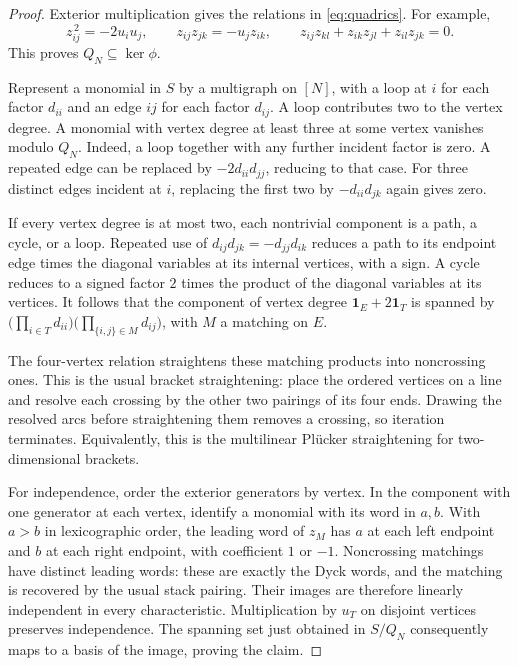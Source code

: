 \documentclass[11pt]{article}
\theoremstyle{definition}
\theoremstyle{remark}
\numberwithin{equation}{section}
\newcommand{\one}{\mathbf{1}}
\begin{document}
\begin{proof}
Exterior multiplication gives the relations in \eqref{eq:quadrics}.
For example,
\[
 z_{ij}^{\,2}=-2u_i u_j,\qquad
 z_{ij}z_{jk}=-u_jz_{ik},\qquad
 z_{ij}z_{kl}+z_{ik}z_{jl}+z_{il}z_{jk}=0.
\]
This proves $Q_N\subseteq\ker\phi$.

Represent a monomial in $S$ by a multigraph on $[N]$, with a loop at $i$
for each factor $d_{ii}$ and an edge $ij$ for each factor $d_{ij}$.
A loop contributes two to the vertex degree. A monomial with vertex
degree at least three at some vertex vanishes modulo $Q_N$. Indeed, a
loop together with any further incident factor is zero. A repeated
edge can be replaced by $-2d_{ii}d_{jj}$, reducing to that case. For
three distinct edges incident at $i$, replacing the first two by
$-d_{ii}d_{jk}$ again gives zero.

If every vertex degree is at most two, each nontrivial component is a
path, a cycle, or a loop. Repeated use of
$d_{ij}d_{jk}=-d_{jj}d_{ik}$ reduces a path to its endpoint edge times
the diagonal variables at its internal vertices, with a sign. A cycle
reduces to a signed factor $2$ times the product of the diagonal
variables at its vertices. It follows that the component of vertex
degree $\one_E+2\one_T$ is spanned by
$\bigl(\prod_{i\in T}d_{ii}\bigr)
 \bigl(\prod_{\{i,j\}\in M}d_{ij}\bigr)$,
with $M$ a matching on $E$.

The four-vertex relation straightens these matching products into
noncrossing ones. This is the usual bracket straightening: place the
ordered vertices on a line and resolve each crossing by the other two
pairings of its four ends. Drawing the resolved arcs before straightening
them removes a crossing, so iteration terminates. Equivalently, this is
the multilinear Pl\"ucker straightening for two-dimensional brackets.

For independence, order the exterior generators by vertex. In the
component with one generator at each vertex, identify a monomial with
its word in $a,b$. With $a>b$ in lexicographic order, the leading word
of $z_M$ has $a$ at each left endpoint and $b$ at each right endpoint,
with coefficient $1$ or $-1$. Noncrossing matchings have distinct leading
words: these are exactly the Dyck words, and the matching is recovered
by the usual stack pairing. Their images are therefore linearly
independent in every characteristic. Multiplication by $u_T$ on disjoint
vertices preserves independence. The spanning set just obtained in
$S/Q_N$ consequently maps to a basis of the image, proving the claim.
\end{proof}
\end{document}
